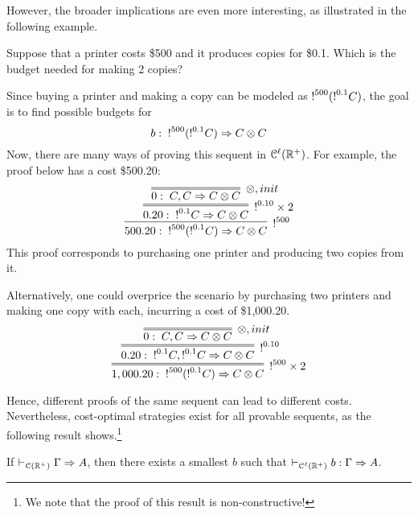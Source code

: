 %
However, the broader implications are even more interesting, as illustrated in the following example.
\begin{example}
Suppose that a printer costs \$500 and it produces copies for \$0.1. Which is the budget needed for making 2 copies?

Since buying a printer and making a copy can be modeled as  $\hbox{$\mathop{!}^{500}$}(\hbox{$\mathop{!}^{0.1}$}C)$, the goal is to find possible budgets for 
$$
b:\;  \hbox{$\mathop{!}^{500}$}(\hbox{$\mathop{!}^{0.1}$}C)\Rightarrow C\otimes C
$$
Now, there are many ways of proving this sequent in $\mathcal{C}^\ell(\mathbb{R}^+)$. For example, the proof below has a cost \$500.20:
$$
\infer[\nbang{500}]{500.20:\;  \nbang{500}(\nbang{0.1}C)\seq C\otimes C}
{\infer=[\nbang{0.10} \times 2]{0.20:\;  \nbang{0.1}C\seq C\otimes C}
{\infer=[\otimes,init]{0:\;  C,C\seq C\otimes C}{}}} 
$$
This proof corresponds to purchasing one printer and producing two copies from it.

Alternatively, one could overprice the scenario by purchasing two printers and making one copy with each, incurring a cost of \$1,000.20.
$$
\infer=[\nbang{500}  \times 2]{1,000.20:\;  \nbang{500}(\nbang{0.1}C)\seq C\otimes C}
{\infer=[\nbang{0.10}]{0.20:\;  \nbang{0.1}C,\nbang{0.1}C\seq C\otimes C}
{\infer=[\otimes,init]{0:\;  C,C\seq C\otimes C}{}}} 
$$
\end{example}
Hence, different proofs of the same sequent can lead to different costs. Nevertheless, cost-optimal strategies exist for all provable sequents, as the following result shows.\footnote{We note that the proof of this result is non-constructive!}

\begin{theorem}\label{cor:spectrum}
If $\vdash_{\mathcal{C}(\mathbb{R}^+)}\Gamma\Rightarrow A$, then there exists a smallest $b$ such that $\vdash_{\mathcal{C}^\ell(\mathbb{R}^+)}b: \Gamma\Rightarrow A$.
\end{theorem}

